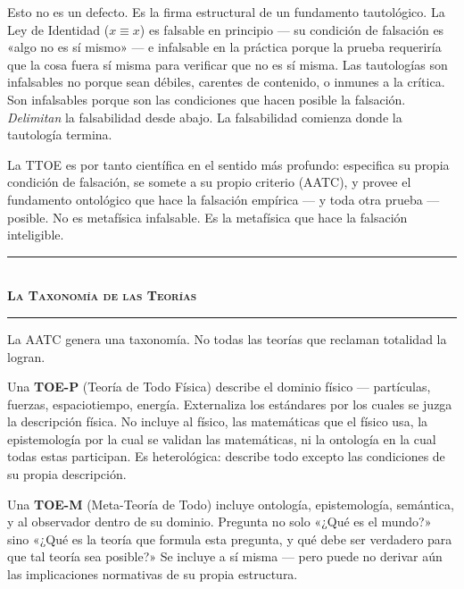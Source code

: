\documentclass[10pt, openany, oneside]{book}
\renewcommand{\normalsize}{\fontsize{10}{13}\selectfont}
\begin{document}
\vspace{0.8em}

\noindent Esto no es un defecto. Es la firma estructural de un fundamento tautológico. La Ley de Identidad ($x \equiv x$) es falsable en principio --- su condición de falsación es «algo no es sí mismo» --- e infalsable en la práctica porque la prueba requeriría que la cosa fuera sí misma para verificar que no es sí misma. Las tautologías son infalsables no porque sean débiles, carentes de contenido, o inmunes a la crítica. Son infalsables porque son las condiciones que hacen posible la falsación. \textit{Delimitan} la falsabilidad desde abajo. La falsabilidad comienza donde la tautología termina.

La TTOE es por tanto científica en el sentido más profundo: especifica su propia condición de falsación, se somete a su propio criterio (AATC), y provee el fundamento ontológico que hace la falsación empírica --- y toda otra prueba --- posible. No es metafísica infalsable. Es la metafísica que hace la falsación inteligible.

\vspace{1.5em}


\begin{center}
    \rule{0.3\textwidth}{0.4pt}\\[0.5em]
    {\normalsize\bfseries\scshape La Taxonomía de las Teorías}\\[0.3em]
    \rule{0.3\textwidth}{0.4pt}
\end{center}

\vspace{1em}

\noindent La AATC genera una taxonomía. No todas las teorías que reclaman totalidad la logran.

Una \textbf{TOE-P} (Teoría de Todo Física) describe el dominio físico --- partículas, fuerzas, espaciotiempo, energía. Externaliza los estándares por los cuales se juzga la descripción física. No incluye al físico, las matemáticas que el físico usa, la epistemología por la cual se validan las matemáticas, ni la ontología en la cual todas estas participan. Es heterológica: describe todo excepto las condiciones de su propia descripción.

Una \textbf{TOE-M} (Meta-Teoría de Todo) incluye ontología, epistemología, semántica, y al observador dentro de su dominio. Pregunta no solo «¿Qué es el mundo?» sino «¿Qué es la teoría que formula esta pregunta, y qué debe ser verdadero para que tal teoría sea posible?» Se incluye a sí misma --- pero puede no derivar aún las implicaciones normativas de su propia estructura.
\end{document}
